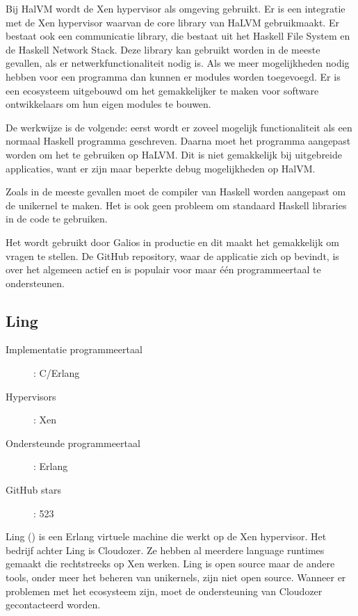 Bij HalVM wordt de Xen hypervisor als omgeving gebruikt. Er is een integratie met de Xen hypervisor waarvan de core library van HaLVM gebruikmaakt. Er bestaat ook een communicatie library, die bestaat uit het Haskell File System en de Haskell Network Stack. Deze library kan gebruikt worden in de meeste gevallen, als er netwerkfunctionaliteit nodig is. Als we meer mogelijkheden nodig hebben voor een programma dan kunnen er modules worden toegevoegd. Er is een ecosysteem uitgebouwd om het gemakkelijker te maken voor software ontwikkelaars om hun eigen modules te bouwen.

De werkwijze is de volgende: eerst wordt er zoveel mogelijk functionaliteit als een normaal Haskell programma geschreven. Daarna moet het programma aangepast worden om het te gebruiken op HaLVM.
Dit is niet gemakkelijk bij uitgebreide applicaties, want er zijn maar beperkte debug mogelijkheden op HalVM.

Zoals in de meeste gevallen moet de compiler van Haskell worden aangepast om de unikernel te maken. Het is ook geen probleem om standaard Haskell libraries in de code te gebruiken.

Het wordt gebruikt door Galios in productie en dit maakt het gemakkelijk om vragen te stellen. De GitHub repository, waar de applicatie zich op bevindt, is over het algemeen actief en is populair voor maar één programmeertaal te ondersteunen.

\subsection{Ling}

\begin{description}
  \item [Implementatie programmeertaal]: C/Erlang
  \item [Hypervisors]: Xen
  \item [Ondersteunde programmeertaal]: Erlang
  \item [GitHub stars]: 523
\end{description}

Ling (\cite{erlang_on_xen_cloudozer/ling_????}) is een Erlang virtuele machine die werkt op de Xen hypervisor. Het bedrijf achter Ling is Cloudozer. Ze hebben al meerdere language runtimes gemaakt die rechtstreeks op Xen werken.
Ling is open source maar de andere tools, onder meer het beheren van unikernels, zijn niet open source. Wanneer er problemen met het ecosysteem zijn, moet de ondersteuning van Cloudozer gecontacteerd worden.

